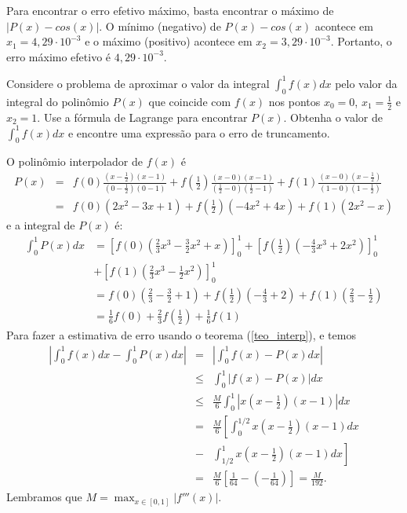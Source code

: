 Para encontrar o erro efetivo máximo, basta encontrar o máximo de $|P(x)-cos(x)|$. O mínimo (negativo) de $P(x)-cos(x)$ acontece em $x_1=4,29\cdot 10^{-3}$ e o máximo (positivo) acontece em $x_2=3,29\cdot 10^{-3}$. Portanto, o erro máximo efetivo é $4,29\cdot 10^{-3}$.

\begin{ex}\label{exemp_simpson}
Considere o problema de aproximar o valor da integral $\int_0^1 f(x)dx$ pelo valor da integral do polinômio $P(x)$ que coincide com $f(x)$ nos pontos $x_0=0$, $x_1=\frac{1}{2}$ e $x_2=1$. Use a fórmula de Lagrange para encontrar $P(x)$. Obtenha o valor de $\int_0^1f(x)dx$ e encontre uma expressão para o erro de truncamento.
\end{ex}
O polinômio interpolador de $f(x)$ é
\begin{eqnarray*}
P(x)&=&f(0)\frac{(x-\frac{1}{2})(x-1)}{(0-\frac{1}{2})(0-1)}+f\left(\frac{1}{2}\right)\frac{(x-0)(x-1)}{(\frac{1}{2}-0)(\frac{1}{2}-1)}+f(1)\frac{(x-0)(x-\frac{1}{2})}{(1-0)(1-\frac{1}{2})}\\
&=&   f(0)(2x^2-3x+1)+f\left(\frac{1}{2}\right)(-4x^2+4x)+f(1)(2x^2-x)
\end{eqnarray*}
e a integral de $P(x)$ é:
\begin{align*}
\int_0^1 P(x)dx &= \left[f(0)\left(\frac{2}{3}x^3 - \frac{3}{2}x^2+x\right)\right]_0^1 + \left[f\left(\frac{1}{2}\right)\left(-\frac{4}{3}x^3+2x^2\right)\right]_0^1 \\
&+ \left[f(1)\left(\frac{2}{3}x^3-\frac{1}{2}x^2\right)\right]_0^1\\
&= f(0)\left(\frac{2}{3}-\frac{3}{2}+1\right)+f\left(\frac{1}{2}\right)\left(-\frac{4}{3}+2\right)+f(1)\left(\frac{2}{3}-\frac{1}{2}\right)\\
&= \frac{1}{6}f(0)+\frac{2}{3}f\left(\frac{1}{2}\right)+\frac{1}{6}f(1)
\end{align*}
Para fazer a estimativa de erro usando o teorema (\ref{teo_interp}), e temos
\begin{eqnarray*}
\left|\int_0^1f(x)dx-\int_0^1 P(x)dx\right|&=&\left|\int_0^1f(x)- P(x)dx\right|\\
&\leq&\int_0^1|f(x)- P(x)|dx\\
&\leq& \frac{M}{6}  \int_0^1\left|x\left(x-\frac{1}{2}\right)(x-1)\right|dx\\
&=& \frac{M}{6}  \left[\int_0^{1/2}x\left(x-\frac{1}{2}\right)(x-1)dx\right.\\
&-&\left.\int_{1/2}^1x\left(x-\frac{1}{2}\right)(x-1)dx\right]\\
&=& \frac{M}{6}  \left[\frac{1}{64}-\left(-\frac{1}{64}\right)\right]=\frac{M}{192}.
\end{eqnarray*}
Lembramos que $M=\max_{x\in[0,1]}|f'''(x)|$.

